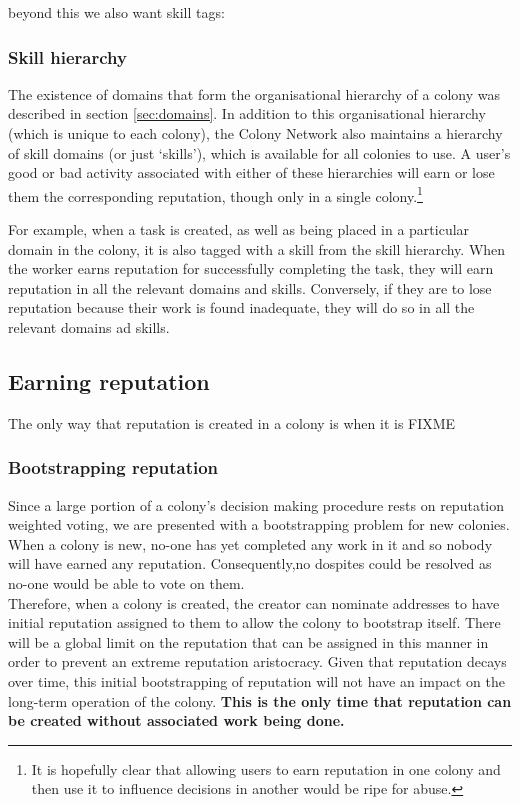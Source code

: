 beyond this we also want skill tags:

\subsubsection{Skill hierarchy}

The existence of domains that form the organisational hierarchy of a colony was described in section \ref{sec:domains}. In addition to this organisational hierarchy (which is unique to each colony), the Colony Network also maintains a hierarchy of skill domains (or just `skills'), which is available for all colonies to use. A user's good or bad activity associated with either of these hierarchies will earn or lose them the corresponding reputation, though only in a single colony.\footnote{It is hopefully clear that allowing users to earn reputation in one colony and then use it to influence decisions in another would be ripe for abuse.}

For example, when a task is created, as well as being placed in a particular domain in the colony, it is also tagged with a skill from the skill hierarchy. When the worker earns reputation for successfully completing the task, they will earn reputation in all the relevant domains and skills. Conversely, if they are to lose reputation because their work is found inadequate, they will do so in all the relevant domains ad skills.

\subsection{Earning reputation}
The only way that reputation is created in a colony is when it is FIXME

\subsubsection{Bootstrapping reputation}

Since a large portion of a colony's decision making procedure rests on reputation weighted voting, we are presented with a bootstrapping problem for new colonies.
When a colony is new, no-one has yet completed any work in it and so nobody will have earned any reputation. Consequently,no dospites could be resolved as no-one would be able to vote on them. \\
Therefore, when a colony is created, the creator can nominate addresses to have initial reputation assigned to them to allow the colony to bootstrap itself. There will be a global limit on the reputation that can be assigned in this manner in order to prevent an extreme reputation aristocracy. Given that reputation decays over time, this initial bootstrapping of reputation will not have an impact on the long-term operation of the colony. \textbf{This is the only time that reputation can be created without associated work being done.}

